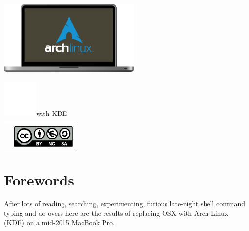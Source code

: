 \vspace*{\fill}
\includegraphics[height=10em]{img/ArchMBP.pdf}\linebreak
\begin{mdframed}[style=titlebox]
	\centering
	\begin{Huge}
	    \par
	\end{Huge}
\end{mdframed}
\vspace*{2em}
\includegraphics[height=5em]{img/kde-logo.pdf}with KDE\par
\vspace*{\fill}
\begin{tabularx}{0.95\textwidth}{lR}
	& \includegraphics[height=3em]{common/licenses/by-nc-sa_eu.pdf}
\end{tabularx}
\vspace*{2em}

\setcounter{page}{1}
\pagecolor{white}
\color{dark}
\normalsize\justify
\tableofcontents
\clearpage

\section{Forewords}

After lots of reading, searching, experimenting, furious late-night shell command typing and 
do-overs here are the results of replacing OSX with Arch Linux (KDE) on a mid-2015 MacBook Pro. 

